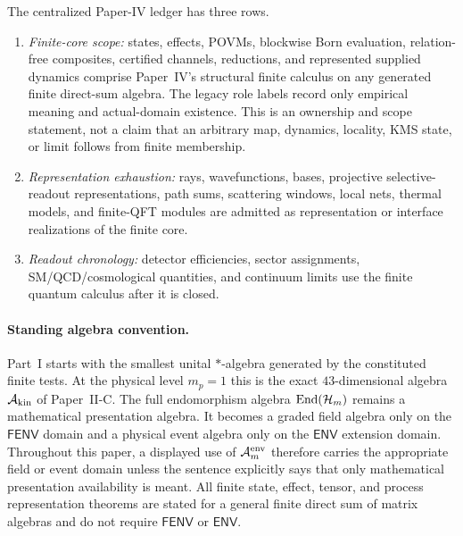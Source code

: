 \documentclass[12pt,a4paper]{article}
\begin{document}
\begin{definition}
\label{p4:def:exhaustion-readout-ledger}
The centralized Paper-IV ledger has three rows.
\begin{enumerate}[label=(\roman*), leftmargin=2em]
\item \emph{Finite-core scope:} states, effects, POVMs, blockwise Born
      evaluation, relation-free composites, certified channels, reductions,
      and represented supplied dynamics comprise Paper~IV's structural finite
      calculus on any generated finite direct-sum algebra.  The legacy role
      labels record only empirical meaning and actual-domain existence.  This
      is an ownership and scope statement, not a claim that an arbitrary map,
      dynamics, locality, KMS state, or limit follows from finite membership.
\item \emph{Representation exhaustion:} rays, wavefunctions, bases, projective selective-readout representations, path sums, scattering windows, local nets, thermal models, and finite-QFT modules are admitted as representation or interface realizations of the finite core.
\item \emph{Readout chronology:} detector efficiencies, sector assignments, SM/QCD/cosmological quantities, and continuum limits use the finite quantum calculus after it is closed.
\end{enumerate}
\end{definition}

\paragraph{Standing algebra convention.}
Part~I starts with the smallest unital \(*\)-algebra generated by the
constituted finite tests.  At the physical level \(m_p=1\) this is the exact
\(43\)-dimensional algebra \(\mathcal A_{\rm kin}\) of Paper~II-C.  The full
endomorphism algebra \(\operatorname{End}(\mathcal H_m)\) remains a mathematical presentation
algebra.  It becomes a graded field algebra only on the
\(\mathsf{FENV}\) domain and a physical event algebra only on the
\(\mathsf{ENV}\) extension domain.  Throughout this paper, a displayed use of
\(\mathcal A_m^{\rm env}\) therefore carries the appropriate field or event
domain unless the sentence explicitly says that only mathematical
presentation availability is meant.
All finite state, effect, tensor, and process representation theorems are
stated for a general finite direct sum of matrix algebras and do not require
\(\mathsf{FENV}\) or \(\mathsf{ENV}\).
\end{document}
